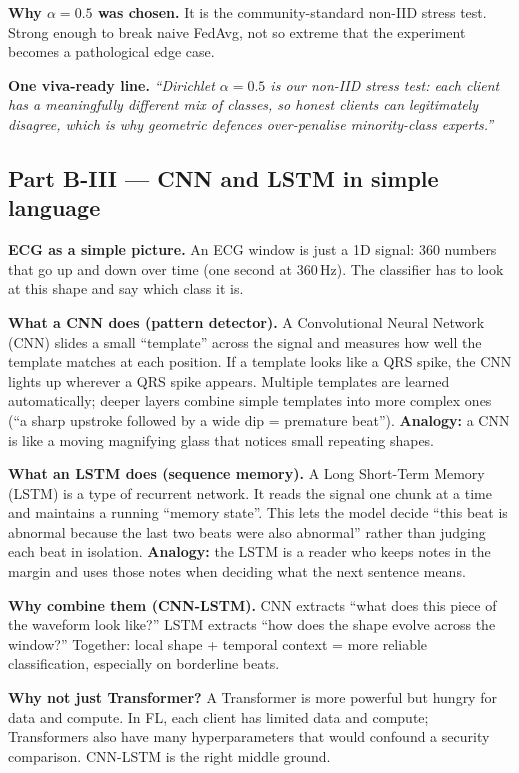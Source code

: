 \documentclass[11pt,a4paper]{article}
\begin{document}
\textbf{Why $\alpha=0.5$ was chosen.} It is the community-standard non-IID stress
test. Strong enough to break naive FedAvg, not so extreme that the experiment
becomes a pathological edge case.

\textbf{One viva-ready line.}
\textit{``Dirichlet $\alpha=0.5$ is our non-IID stress test: each client has a
meaningfully different mix of classes, so honest clients can legitimately disagree,
which is why geometric defences over-penalise minority-class experts.''}

\subsection{Part B-III --- CNN and LSTM in simple language}
\label{sec:cnn-lstm}

\textbf{ECG as a simple picture.} An ECG window is just a 1D signal: 360 numbers
that go up and down over time (one second at 360\,Hz). The classifier has to
look at this shape and say which class it is.

\textbf{What a CNN does (pattern detector).}
A Convolutional Neural Network (CNN) slides a small ``template'' across the
signal and measures how well the template matches at each position. If a
template looks like a QRS spike, the CNN lights up wherever a QRS spike appears.
Multiple templates are learned automatically; deeper layers combine simple
templates into more complex ones (``a sharp upstroke followed by a wide dip =
premature beat''). \textbf{Analogy:} a CNN is like a moving magnifying glass
that notices small repeating shapes.

\textbf{What an LSTM does (sequence memory).}
A Long Short-Term Memory (LSTM) is a type of recurrent network. It reads the
signal one chunk at a time and maintains a running ``memory state''. This lets
the model decide ``this beat is abnormal because the last two beats were also
abnormal'' rather than judging each beat in isolation. \textbf{Analogy:} the
LSTM is a reader who keeps notes in the margin and uses those notes when deciding
what the next sentence means.

\textbf{Why combine them (CNN-LSTM).}
CNN extracts ``what does this piece of the waveform look like?''
LSTM extracts ``how does the shape evolve across the window?''
Together: local shape + temporal context = more reliable classification,
especially on borderline beats.

\textbf{Why not just Transformer?}
A Transformer is more powerful but hungry for data and compute. In FL, each
client has limited data and compute; Transformers also have many hyperparameters
that would confound a security comparison. CNN-LSTM is the right middle ground.
\end{document}
